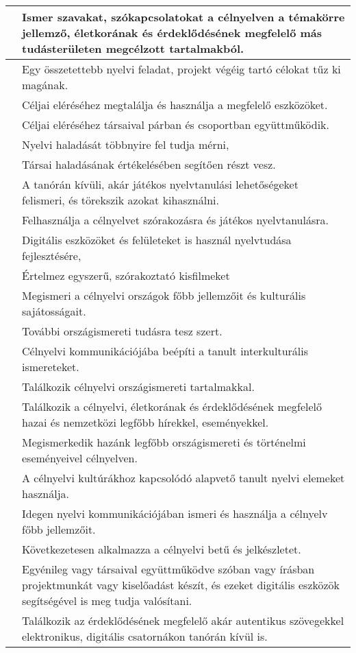 \begin{longtable}[]{p{\evflength}@{\strut}>{\begin{minipage}{\columnlength}\strut}l<{\strut\end{minipage}}}
\hline
&
  Ismer szavakat, szókapcsolatokat a célnyelven a témakörre jellemző,
  életkorának és érdeklődésének megfelelő más tudásterületen megcélzott
  tartalmakból.
\tabularnewline
\hline
&
  Egy összetettebb nyelvi feladat, projekt végéig tartó célokat tűz ki
  magának.
\tabularnewline
\hline
&
  Céljai eléréséhez megtalálja és használja a megfelelő eszközöket.
\tabularnewline
\hline
&
  Céljai eléréséhez társaival párban és csoportban együttműködik.
\tabularnewline
\hline
&
  Nyelvi haladását többnyire fel tudja mérni,
\tabularnewline
\hline
&
  Társai haladásának értékelésében segítően részt vesz.
\tabularnewline
\hline
&
  A tanórán kívüli, akár játékos nyelvtanulási lehetőségeket felismeri,
  és törekszik azokat kihasználni.
\tabularnewline
\hline
&
  Felhasználja a célnyelvet szórakozásra és játékos nyelvtanulásra.
\tabularnewline
\hline
&
  Digitális eszközöket és felületeket is használ nyelvtudása
  fejlesztésére,
\tabularnewline
\hline
&
  Értelmez egyszerű, szórakoztató kisfilmeket
\tabularnewline
\hline
&
  Megismeri a célnyelvi országok főbb jellemzőit és kulturális
  sajátosságait.
\tabularnewline
\hline
&
  További országismereti tudásra tesz szert.
\tabularnewline
\hline
&
  Célnyelvi kommunikációjába beépíti a tanult interkulturális
  ismereteket.
\tabularnewline
\hline
&
  Találkozik célnyelvi országismereti tartalmakkal.
\tabularnewline
\hline
&
  Találkozik a célnyelvi, életkorának és érdeklődésének megfelelő hazai
  és nemzetközi legfőbb hírekkel, eseményekkel.
\tabularnewline
\hline
&
  Megismerkedik hazánk legfőbb országismereti és történelmi eseményeivel
  célnyelven.
\tabularnewline
\hline
&
  A célnyelvi kultúrákhoz kapcsolódó alapvető tanult nyelvi elemeket
  használja.
\tabularnewline
\hline
&
  Idegen nyelvi kommunikációjában ismeri és használja a célnyelv főbb
  jellemzőit.
\tabularnewline
\hline
&
  Következetesen alkalmazza a célnyelvi betű és jelkészletet.
\tabularnewline
\hline
&
  Egyénileg vagy társaival együttműködve szóban vagy írásban
  projektmunkát vagy kiselőadást készít, és ezeket digitális eszközök
  segítségével is meg tudja valósítani.
\tabularnewline
\hline
&
  Találkozik az érdeklődésének megfelelő akár autentikus szövegekkel
  elektronikus, digitális csatornákon tanórán kívül is.
\tabularnewline
\hline
\end{longtable}


